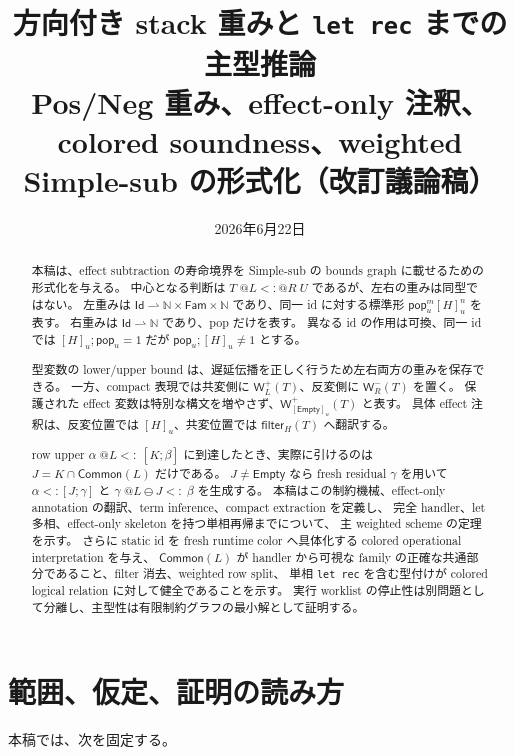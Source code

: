 \documentclass[uplatex,dvipdfmx,a4paper,10.5pt]{jsarticle}
\title{方向付き stack 重みと \texttt{let rec} までの主型推論\\
\large Pos/Neg 重み、effect-only 注釈、colored soundness、weighted Simple-sub の形式化（改訂議論稿）}
\author{}
\date{2026年6月22日}
\makeatletter
\theoremstyle{jpplain}
\newcommand{\Fam}{\mathsf{Fam}}
\newcommand{\Id}{\mathsf{Id}}
\newcommand{\Nat}{\mathbb N}
\newcommand{\Empty}{\mathsf{Empty}}
\newcommand{\Common}{\mathsf{Common}}
\newcommand{\Filter}[2]{\mathsf{filter}_{#1}(#2)}
\newcommand{\PWeight}[2]{\mathsf{W}^{+}_{#1}(#2)}
\newcommand{\NWeight}[2]{\mathsf{W}^{-}_{#1}(#2)}
\newcommand{\takeop}[2]{[#1]_{#2}}
\newcommand{\popop}[1]{\mathsf{pop}_{#1}}
\newcommand{\row}[2]{[#1;#2]}
\newcommand{\wsub}[4]{#1\;@#2\mathrel{<:}@#3\;#4}
\newcommand{\lsub}[3]{#1\;@#2\mathrel{<:}\;#3}
\newcommand{\subty}[2]{#1\mathrel{<:}#2}
\makeatother
\begin{document}
\maketitle

\begin{abstract}
本稿は、effect subtraction の寿命境界を Simple-sub の bounds graph に載せるための形式化を与える。
中心となる判断は $\wsub{T}{L}{R}{U}$ であるが、左右の重みは同型ではない。
左重みは $\Id\rightharpoonup\Nat\times\Fam\times\Nat$ であり、同一 id に対する標準形
$\popop{u}^{m}\takeop{H}{u}^{n}$ を表す。
右重みは $\Id\rightharpoonup\Nat$ であり、pop だけを表す。
異なる id の作用は可換、同一 id では $\takeop{H}{u};\popop{u}=1$ だが
$\popop{u};\takeop{H}{u}\neq 1$ とする。

型変数の lower/upper bound は、遅延伝播を正しく行うため左右両方の重みを保存できる。
一方、compact 表現では共変側に $\PWeight{L}{T}$、反変側に $\NWeight{R}{T}$ を置く。
保護された effect 変数は特別な構文を増やさず、$\PWeight{\takeop{\Empty}{u}}{T}$ と表す。
具体 effect 注釈は、反変位置では $\takeop{H}{u}$、共変位置では $\Filter{H}{T}$ へ翻訳する。

row upper $\lsub{\alpha}{L}{\row{K}{\beta}}$ に到達したとき、実際に引けるのは
$J=K\cap\Common(L)$ だけである。
$J\neq\Empty$ なら fresh residual $\gamma$ を用いて
$\subty{\alpha}{\row{J}{\gamma}}$ と
$\lsub{\gamma}{L\ominus J}{\beta}$ を生成する。
本稿はこの制約機械、effect-only annotation の翻訳、term inference、compact extraction を定義し、
完全 handler、let 多相、effect-only skeleton を持つ単相再帰までについて、
主 weighted scheme の定理を示す。
さらに static id を fresh runtime color へ具体化する colored operational interpretation を与え、
$\Common(L)$ が handler から可視な family の正確な共通部分であること、filter 消去、weighted row split、
単相 \texttt{let rec} を含む型付けが colored logical relation に対して健全であることを示す。
実行 worklist の停止性は別問題として分離し、主型性は有限制約グラフの最小解として証明する。
\end{abstract}

\tableofcontents

\section{範囲、仮定、証明の読み方}

本稿では、次を固定する。
\end{document}
